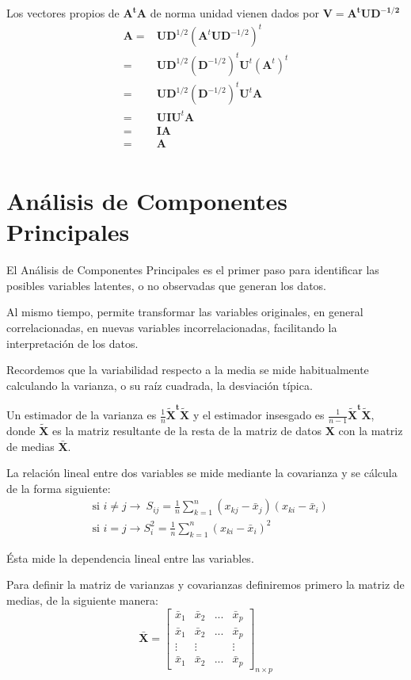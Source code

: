 \documentclass[12pt,letterpaper]{report} %
\begin{document}
Los vectores propios de $\mathbf{A^tA}$ de norma unidad vienen dados por $\mathbf{V}=\mathbf{A^t U D^{-1/2}}$
$$ 
\begin{array}{rl}
\mathbf{A}= & \mathbf{U}\mathbf{D}^{1/2}(\mathbf{A}^t \mathbf{U} \mathbf{D}^{-1/2})^t\\
= & \mathbf{UD}^{1/2}(\mathbf{D}^{-1/2})^t\mathbf{U}^t(\mathbf{A}^t)^t\\
= & \mathbf{UD}^{1/2}(\mathbf{D}^{-1/2})^t\mathbf{U}^t \mathbf{A}\\
= & \mathbf{UI}\mathbf{U}^t \mathbf{A}\\
= & \mathbf{I} \mathbf{A}\\
= & \mathbf{A}\\
\end{array}
$$

\section{Análisis de Componentes Principales}

El Análisis de Componentes Principales es el primer paso para identificar las posibles variables latentes, o no observadas que generan los datos. 

Al mismo tiempo, permite transformar las variables originales, en general correlacionadas, en nuevas variables incorrelacionadas, facilitando la interpretación de los datos.

Recordemos que la variabilidad respecto a la media se mide habitualmente calculando la varianza, o su raíz cuadrada, la desviación típica. 

Un estimador de la varianza es $\frac{1}{n}\mathbf{\tilde{X}^t\tilde{X}}$ y el estimador insesgado es $\frac{1}{n-1}\mathbf{\tilde{X}^t\tilde{X}}$, donde $\mathbf{\tilde{X}}$ es la matriz resultante de la resta de la matriz de datos $\mathbf{X}$ con la matriz de medias $\bar{\mathbf{X}}$.

La relación lineal entre dos variables se mide mediante la covarianza y se cálcula de la forma siguiente:
$$
\begin{array}{rl}
& \mbox{si }i\ne j  \to \ S_{ij} = \frac{1}{n}\sum_{k=1}^{n}(x_{kj}-\bar x_{j})(x_{ki}-\bar x_{i}) \\
& \mbox{si }i=j \to S_{i}^2 = \frac{1}{n}\sum_{k=1}^{n}(x_{ki}-\bar x_{i})^2
\end{array}
$$

Ésta mide la dependencia lineal entre las variables.

Para definir la matriz de varianzas y covarianzas definiremos primero la matriz de medias, de la siguiente manera:
$$
\bar{\mathbf{X}}=\begin{bmatrix}
\bar{x}_{1} & \bar{x}_{2} & ... & \bar{x}_{p} \\
\bar{x}_{1} & \bar{x}_{2} & ... & \bar{x}_{p} \\
\vdots & \vdots &   & \vdots \\
\bar{x}_{1} & \bar{x}_{2} & ... & \bar{x}_{p}
\end{bmatrix}_{n\times p}
$$
\end{document}

